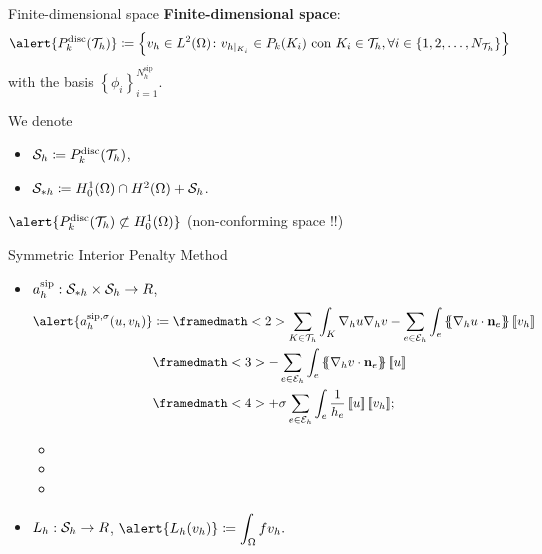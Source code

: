 \begin{frame}{Finite-dimensional space}
\textbf{Finite-dimensional space}:{\small $$\alert{\Pd_k(\T_h)}\coloneqq\left\{v_h\in L^2(\Omega)\colon v_{h|_{K_i}}\in\mathbb{P}_k(K_i)\text{ con } K_i\in\T_h,\forall i\in\left\{1,2,\ldots,N_{\T_h}\right\}\right\}$$ with the basis $\left\{\phi_i\right\}_{i=1}^{N_h^{\text{sip}}}$.}
\vspace*{1cm}

We denote
\begin{itemize}\itemsep1em
\item $\S_h\coloneqq\Pd_k(\T_h)$,
\item $\S_{*h}\coloneqq H^1_0(\Omega)\cap H^2(\Omega)+\S_h$.
\end{itemize}
\vspace*{1cm}
\pause
$\alert{\Pd_k(\T_h)\not\subset H_0^1(\Omega)}$ (non-conforming space \alert{!!})
\end{frame}

\begin{frame}{Symmetric Interior Penalty Method}
	\scriptsize
\begin{itemize}\itemsep1em
	\item $a_h^{\text{sip}}:\S_{*h}\times \S_h\to\R$,
	\begin{equation*}
	\label{forma_bilineal_DG}
	\begin{aligned}
	\alert{\asip{u}{v_h}}&\coloneqq \framedmath<2>{\displaystyle \sum_{K\in\T_h}\int_K\nabla_h u\nabla_h v-\sum_{e\in\E_h}\int_e\media{\nabla_h u\cdot\mathbf{n}_e}\salto{v_h}}\\&\framedmath<3>{\displaystyle -\sum_{e\in\E_h}\int_e\media{\nabla_h v\cdot\mathbf{n}_e}\salto{u}}\\&\framedmath<4>{\displaystyle +\sigma\sum_{e\in\E_h}\int_e\frac{1}{h_e}\salto{u}\salto{v_h}};
	\end{aligned}
	\end{equation*}
	\begin{itemize}
		\item<2> 
		\item<3> 
		\item<4> 
	\end{itemize}
	\item $L_h:\S_h\to\R$, $\displaystyle \alert{L_h(v_h)}\coloneqq \int_\Omega f v_h.$
\end{itemize}

\end{frame}

